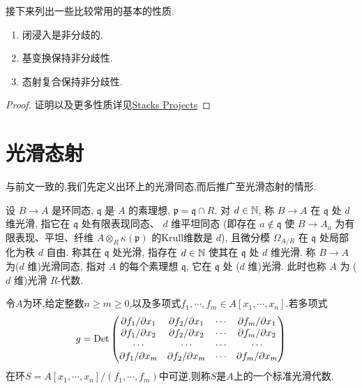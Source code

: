 接下来列出一些比较常用的基本的性质.
\begin{proposition}
    \begin{enumerate}
        \item 闭浸入是非分歧的.
        \item 基变换保持非分歧性.
        \item 态射复合保持非分歧性.
    \end{enumerate}
\end{proposition}
\begin{proof}
    证明以及更多性质详见\href{https://stacks.math.columbia.edu/tag/00UV}{Stacks Projects}
\end{proof}
\section{光滑态射}
与前文一致的,我们先定义出环上的光滑同态,而后推广至光滑态射的情形.
\begin{definition}[光滑同态]
    设 $B\to A$ 是环同态, $\mathfrak{q}$ 是 $A$ 的素理想,
    $\mathfrak{p}=\mathfrak{q}\cap R$. 对 $d\in\mathbb{N}$, 
    称 $B\to A$ 在 $\mathfrak{q}$ 处 $d$ 维光滑, 
    指它在 $\mathfrak{q}$ 处有限表现同态、
    $d$ 维平坦同态 (即存在 $a\notin\mathfrak{q}$ 
    使 $B\to A_a$ 为有限表现、平坦、纤维 
    $A\otimes_R\kappa(\mathfrak{p})$ 的Krull维数是 $d$), 
    且微分模 $\Omega_{A/R}$ 在 $\mathfrak{q}$ 处局部化为秩 $d$ 自由. 
    称其在 $\mathfrak{q}$ 处光滑, 
    指存在 $d\in\mathbb{N}$ 使其在 $\mathfrak{q}$ 处 $d$ 维光滑. 
    称 $B\to A$ 为($d$ 维)光滑同态, 指对 $A$ 
    的每个素理想 $\mathfrak{q}$, 它在 $\mathfrak{q}$ 处 
    ($d$ 维)光滑. 此时也称 $A$ 为 ($d$ 维)光滑 $R$-代数.
\end{definition}
\begin{example}[标准光滑代数]
    令$A$为环,给定整数$n \geq m \geq 0$,以及多项式$f_1,\cdots,f_m \in A[x_1,\cdots,x_n]$.若多项式
    \begin{equation*}
        g = \operatorname{Det}\left( \begin{matrix}
	\partial f_1/\partial x_1&		\partial f_2/\partial x_1&		\cdots&		\partial f_m/\partial x_1\\
	\partial f_1/\partial x_2&		\partial f_2/\partial x_2&		\cdots&		\partial f_m/\partial x_2\\
	\cdots&		\cdots&		\cdots&		\cdots\\
	\partial f_1/\partial x_m&		\partial f_2/\partial x_m&		\cdots&		\partial f_m/\partial x_m\\
\end{matrix} \right) 
    \end{equation*}
    在环$S = A[x_1,\cdots,x_n]/(f_1,\cdots,f_m)$中可逆,则称$S$是$A$上的一个标准光滑代数.
\end{example}
